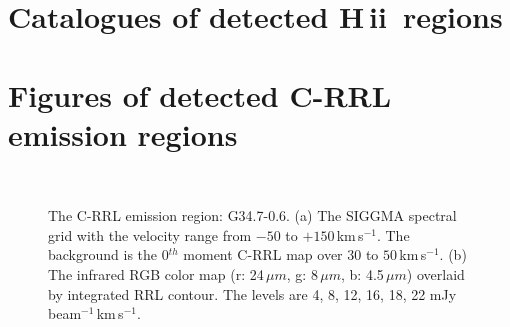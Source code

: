 \documentclass[manuscript]{aastex61}
\newcommand{\hii}{{\rm H\,}{{\sc ii}}}
\newcommand{\kms}{\,km\,s$^{-1}$}
\newcommand{\um}{\mu m}
\begin{document}
\newpage
\appendix

\section{Catalogues of detected \hii\ regions}\label{appe:cata}


\newpage

\section{Figures of detected C-RRL emission regions}\label{appe:crrl}

\begin{figure}[H]
	\centering
	\\ 
	\caption{The C-RRL emission region: G34.7-0.6.
	(a) The SIGGMA spectral grid with the velocity range from $-50$ to $+150$\kms.
	The background is the 0$^{th}$ moment C-RRL map over $30$ to $50$\kms.
	(b) The infrared RGB color map (r: 24\,$\um$, g: 8\,$\um$, b: 4.5\,$\um$) overlaid by integrated RRL contour.
	The levels are 4, 8, 12, 16, 18, 22 mJy\,beam$^{-1}$\kms.}
	\label{fig_crrl-g347}
\end{figure}
\end{document}
